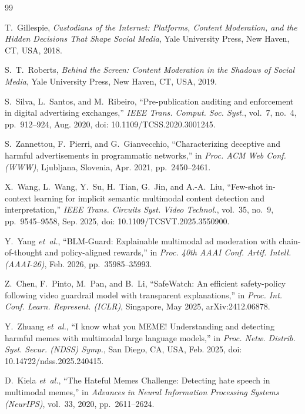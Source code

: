 \documentclass[12pt,a4paper]{report}
\begin{document}

\begin{thebibliography}{99}

T.~Gillespie,
\emph{Custodians of the Internet: Platforms, Content Moderation, and the Hidden Decisions That Shape Social Media},
Yale University Press, New Haven, CT, USA, 2018.

S.~T.~Roberts,
\emph{Behind the Screen: Content Moderation in the Shadows of Social Media},
Yale University Press, New Haven, CT, USA, 2019.

S.~Silva, L.~Santos, and M.~Ribeiro,
``Pre-publication auditing and enforcement in digital advertising exchanges,''
\emph{IEEE Trans. Comput. Soc. Syst.}, vol.~7, no.~4, pp.~912--924, Aug. 2020, doi: 10.1109/TCSS.2020.3001245.

S.~Zannettou, F.~Pierri, and G.~Gianvecchio,
``Characterizing deceptive and harmful advertisements in programmatic networks,''
in \emph{Proc. ACM Web Conf. (WWW)}, Ljubljana, Slovenia, Apr. 2021, pp.~2450--2461.

X.~Wang, L.~Wang, Y.~Su, H.~Tian, G.~Jin, and A.-A.~Liu,
``Few-shot in-context learning for implicit semantic multimodal content detection and interpretation,''
\emph{IEEE Trans. Circuits Syst. Video Technol.}, vol.~35, no.~9, pp.~9545--9558, Sep. 2025, doi: 10.1109/TCSVT.2025.3550900.

Y.~Yang \emph{et~al.},
``BLM-Guard: Explainable multimodal ad moderation with chain-of-thought and policy-aligned rewards,''
in \emph{Proc. 40th AAAI Conf. Artif. Intell. (AAAI-26)}, Feb. 2026, pp.~35985--35993.

Z.~Chen, F.~Pinto, M.~Pan, and B.~Li,
``SafeWatch: An efficient safety-policy following video guardrail model with transparent explanations,''
in \emph{Proc. Int. Conf. Learn. Represent. (ICLR)}, Singapore, May 2025, arXiv:2412.06878.

Y.~Zhuang \emph{et~al.},
``I know what you MEME! Understanding and detecting harmful memes with multimodal large language models,''
in \emph{Proc. Netw. Distrib. Syst. Secur. (NDSS) Symp.}, San Diego, CA, USA, Feb. 2025, doi: 10.14722/ndss.2025.240415.

D.~Kiela \emph{et~al.},
``The Hateful Memes Challenge: Detecting hate speech in multimodal memes,''
in \emph{Advances in Neural Information Processing Systems (NeurIPS)}, vol.~33, 2020, pp.~2611--2624.


\end{thebibliography}
\end{document}
